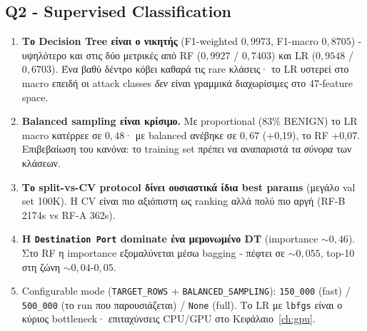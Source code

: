 \documentclass[12pt,a4paper,twoside]{book}
\begin{document}
\subsection{Q2 - Supervised Classification}
\begin{enumerate}
    \item \textbf{Το Decision Tree είναι ο νικητής} (F1-weighted
    \(0{,}9973\), F1-macro \(0{,}8705\)) - υψηλότερο και στις δύο μετρικές
    από RF (\(0{,}9927\) / \(0{,}7403\)) και LR (\(0{,}9548\) /
    \(0{,}6703\)). Ένα βαθύ δέντρο κόβει καθαρά τις rare κλάσεις· το LR
    υστερεί στο macro επειδή οι attack classes \emph{δεν} είναι γραμμικά
    διαχωρίσιμες στο 47-feature space.
    \item \textbf{Balanced sampling είναι κρίσιμο.} Με proportional
    (\(83\%\) BENIGN) το LR macro κατέρρεε σε \(0{,}48\)· με balanced
    ανέβηκε σε \(0{,}67\) (+0,19), το RF +0,07. Επιβεβαίωση του κανόνα:
    το training set πρέπει να αναπαριστά τα \emph{σύνορα} των κλάσεων.
    \item \textbf{Το split-vs-CV protocol δίνει ουσιαστικά ίδια best
    params} (μεγάλο val set 100K). Η CV είναι πιο αξιόπιστη ως ranking
    αλλά πολύ πιο αργή (RF-B 2174s vs RF-A 362s).
    \item \textbf{Η \texttt{Destination Port} dominate ένα μεμονωμένο DT}
    (importance \(\sim 0{,}46\)). Στο RF η importance εξομαλύνεται μέσω
    bagging - πέφτει σε \(\sim 0{,}055\), top-10 στη ζώνη \(\sim 0{,}04\)-\(0{,}05\).
    \item Configurable mode (\texttt{TARGET\_ROWS} + \texttt{BALANCED\_SAMPLING}):
    \texttt{150\_000} (fast) / \texttt{500\_000} (το run που παρουσιάζεται)
    / \texttt{None} (full). Το LR με \texttt{lbfgs} είναι ο κύριος
    bottleneck· επιταχύνσεις CPU/GPU στο Κεφάλαιο~\ref{ch:gpu}.
\end{enumerate}
\end{document}
